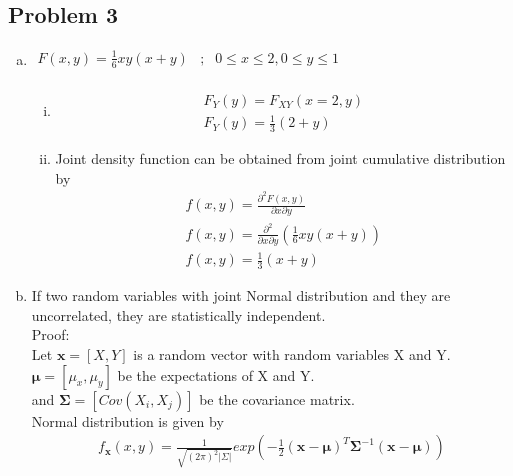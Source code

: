 \documentclass{article}
\begin{document}
\begin{enumerate}[(i)]
    \newpage
    \subsection{Problem 3} %
    \label{sub:problem_3}
    
    \begin{enumerate}[(a)]
        \item $\begin{array}{lcr}
            F(x, y) = \frac{1}{6} xy(x+y) & ; & 0 \leq x \leq 2, 0 \leq y \leq 1\\
        \end{array}$
        \begin{enumerate}[(i)]
            \item
            \begin{align}
                F_{Y}(y) = F_{XY}(x=2,y) \nonumber\\ 
                F_{Y}(y) = \frac{1}{3} (2+y) \nonumber
            \end{align}
            \item Joint density function can be obtained from joint cumulative distribution by\\
            \begin{align}
                f(x, y) = \frac{\partial ^2 F(x, y)}{\partial x \partial y} \nonumber\\
                f(x, y) = \frac{\partial ^2 }{\partial x \partial y} (\frac{1}{6} xy(x+y)) \nonumber\\
                f(x, y) = \frac{1}{3} (x+y) \nonumber
            \end{align}
        \end{enumerate}
        \item If two random variables with joint Normal distribution and they are uncorrelated, they are statistically independent.\\
        Proof:\\
        Let $\mathbf{x} = [X, Y]$ is a random vector with random variables X and Y.\\
        $\mathbf{\mu} = [\mu_{x}, \mu_{y}]$ be the expectations of X and Y.\\
        and $\mathbf{\Sigma} = [Cov(X_{i}, X_{j})]$ be the covariance matrix.\\
        Normal distribution is given by
        \begin{align}
            f_{\mathbf{x}}(x, y) = \frac{1}{\sqrt{(2\pi)^2 |\Sigma|}} exp(- \frac{1}{2}(\mathbf{x} - \mathbf{\mu})^T \mathbf{\Sigma}^{-1}(\mathbf{x} - \mathbf{\mu}))\\

\end{align}
\end{enumerate}
\end{enumerate}
\end{document}
